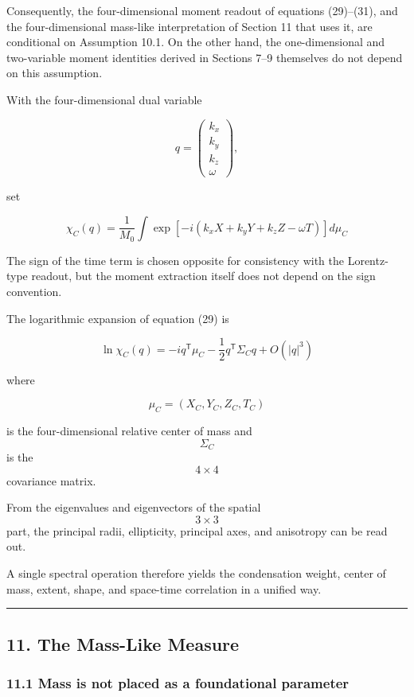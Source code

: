 \documentclass[
  a4paper,
]{article}
\begin{document}
Consequently, the four-dimensional moment readout of equations
(29)--(31), and the four-dimensional mass-like interpretation of Section
11 that uses it, are conditional on Assumption 10.1. On the other hand,
the one-dimensional and two-variable moment identities derived in
Sections 7--9 themselves do not depend on this assumption.

With the four-dimensional dual variable

\[
q
=
\begin{pmatrix}
k_x\\
k_y\\
k_z\\
\omega
\end{pmatrix},
\]

set

\[
\boxed{
\chi_C(q)
=
\frac{1}{M_0}
\int
\exp
\left[
-i
\left(
k_xX+k_yY+k_zZ-\omega T
\right)
\right]
d\mu_C
}
\tag{29}
\]

The sign of the time term is chosen opposite for consistency with the
Lorentz-type readout, but the moment extraction itself does not depend
on the sign convention.

The logarithmic expansion of equation (29) is

\[
\boxed{
\ln\chi_C(q)
=
-iq^{\mathsf T}\mu_C
-
\frac12q^{\mathsf T}\Sigma_C q
+
O(|q|^3)
}
\tag{30}
\]

where

\[
\boxed{
\mu_C
=
(X_C,Y_C,Z_C,T_C)
}
\tag{31}
\]

is the four-dimensional relative center of mass and \[\Sigma_C\] is the
\[4\times4\] covariance matrix.

From the eigenvalues and eigenvectors of the spatial \[3\times3\] part,
the principal radii, ellipticity, principal axes, and anisotropy can be
read out.

A single spectral operation therefore yields the condensation weight,
center of mass, extent, shape, and space-time correlation in a unified
way.

\begin{center}\rule{0.5\linewidth}{0.5pt}\end{center}

\subsection{11. The Mass-Like Measure}\label{the-mass-like-measure}

\subsubsection{11.1 Mass is not placed as a foundational
parameter}\label{mass-is-not-placed-as-a-foundational-parameter}
\end{document}
